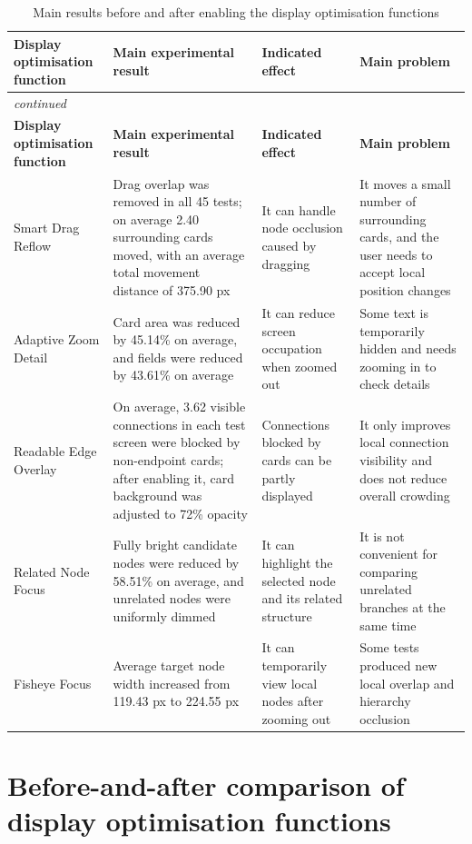 \documentclass[11pt,a4paper,oneside,extrafontsizes]{memoir}
\begin{document}
\begin{center}

\begin{longtable}{@{}p{} p{} p{} p{}@{}}
\caption{Main results before and after enabling the display optimisation functions}\label{tab:display-main-results}\\
\toprule
\textbf{Display optimisation function} & \textbf{Main experimental result} & \textbf{Indicated effect} & \textbf{Main problem} \\
\midrule
\endfirsthead
\multicolumn{4}{l}{\itshape continued}\\
\toprule
\textbf{Display optimisation function} & \textbf{Main experimental result} & \textbf{Indicated effect} & \textbf{Main problem} \\
\midrule
\endhead
Smart Drag Reflow & Drag overlap was removed in all 45 tests; on average 2.40 surrounding cards moved, with an average total movement distance of 375.90 px & It can handle node occlusion caused by dragging & It moves a small number of surrounding cards, and the user needs to accept local position changes \\
Adaptive Zoom Detail & Card area was reduced by 45.14\% on average, and fields were reduced by 43.61\% on average & It can reduce screen occupation when zoomed out & Some text is temporarily hidden and needs zooming in to check details \\
Readable Edge Overlay & On average, 3.62 visible connections in each test screen were blocked by non-endpoint cards; after enabling it, card background was adjusted to 72\% opacity & Connections blocked by cards can be partly displayed & It only improves local connection visibility and does not reduce overall crowding \\
Related Node Focus & Fully bright candidate nodes were reduced by 58.51\% on average, and unrelated nodes were uniformly dimmed & It can highlight the selected node and its related structure & It is not convenient for comparing unrelated branches at the same time \\
Fisheye Focus & Average target node width increased from 119.43 px to 224.55 px & It can temporarily view local nodes after zooming out & Some tests produced new local overlap and hierarchy occlusion \\
\bottomrule
\end{longtable}
\end{center}

\section{Before-and-after comparison of display optimisation functions}
\end{document}
